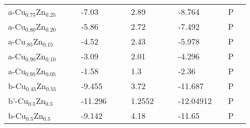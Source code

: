 \begin{landscape}
\begin{center}
\begin{longtable}{|l|p{2.5cm}|l|p{2.5cm}|l|l|p{2.5cm}|l|l|p{2.5cm}|l|l|l|}
a-Cu$_{0.75}$Zn$_{0.25}$     &                            &                   & -7.03               &     & \citep{KubaschewskiCatterallJohnAshley.1956} & 2.89               &     & \citep{KubaschewskiCatterallJohnAshley.1956} & -8.764                              &     & P                 \\
a-Cu$_{0.80}$Zn$_{0.20}$     &                            &                   & -5.86               &     & \citep{KubaschewskiCatterallJohnAshley.1956} & 2.72               &     & \citep{KubaschewskiCatterallJohnAshley.1956} & -7.492                              &     & P                 \\
a-Cu$_{.85}$Zn$_{0.15 }$    &                            &                   & -4.52               &     & \citep{KubaschewskiCatterallJohnAshley.1956} & 2.43               &     & \citep{KubaschewskiCatterallJohnAshley.1956} & -5.978                              &     & P                 \\
a-Cu$_{0.90}$Zn$_{0.10 }$    &                            &                   & -3.09               &     & \citep{KubaschewskiCatterallJohnAshley.1956} & 2.01               &     & \citep{KubaschewskiCatterallJohnAshley.1956} & -4.296                              &     & P                 \\
a-Cu$_{0.95}$Zn$_{0.05 }$    &                            &                   & -1.58               &     & \citep{KubaschewskiCatterallJohnAshley.1956} & 1.3                &     & \citep{KubaschewskiCatterallJohnAshley.1956} & -2.36                               &     & P                 \\
b-Cu$_{0.45}$Zn$_{0.55 }$    &                            &                   & -9.455              &     & \citep{KubaschewskiCatterallJohnAshley.1956} & 3.72               &     & \citep{KubaschewskiCatterallJohnAshley.1956} & -11.687                             &     & P                 \\
b'-Cu$_{0.5}$Zn$_{0.5 }$     &                            &                   & -11.296             &     & \citep{KubaschewskiCatterallJohnAshley.1956} & 1.2552             &     & \citep{KubaschewskiCatterallJohnAshley.1956} & -12.04912                           &     & P                 \\
b-Cu$_{0.5}$Zn$_{0.5 }$      &                            &                   & -9.142              &     & \citep{KubaschewskiCatterallJohnAshley.1956} & 4.18               &     & \citep{KubaschewskiCatterallJohnAshley.1956} & -11.65                              &     & P                 \\

\end{longtable}
\end{center}
\end{landscape}
